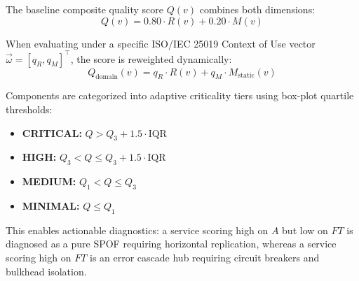 The baseline composite quality score $Q(v)$ combines both dimensions:
\begin{equation}
Q(v) = 0.80 \cdot R(v) + 0.20 \cdot M(v)
\end{equation}

When evaluating under a specific ISO/IEC 25019 Context of Use vector $\vec{\omega} = [q_R, q_M]^\top$, the score is reweighted dynamically:
\begin{equation}
Q_{\text{domain}}(v) = q_R \cdot R(v) + q_M \cdot M_{\text{static}}(v)
\end{equation}

Components are categorized into adaptive criticality tiers using box-plot quartile thresholds:
\begin{itemize}
    \item \textbf{CRITICAL:} $Q > Q_3 + 1.5 \cdot \text{IQR}$
    \item \textbf{HIGH:} $Q_3 < Q \le Q_3 + 1.5 \cdot \text{IQR}$
    \item \textbf{MEDIUM:} $Q_1 < Q \le Q_3$
    \item \textbf{MINIMAL:} $Q \le Q_1$
\end{itemize}

This enables actionable diagnostics: a service scoring high on $A$ but low on $FT$ is diagnosed as a pure SPOF requiring horizontal replication, whereas a service scoring high on $FT$ is an error cascade hub requiring circuit breakers and bulkhead isolation.
